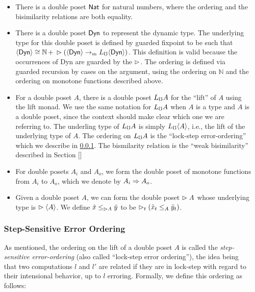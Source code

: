 \begin{itemize}
  \item There is a double poset $\mathsf{Nat}$ for natural numbers, where the ordering and the
  bisimilarity relations are both equality.
  
  \item There is a double poset $\mathsf{Dyn}$ to represent the dynamic type. The underlying type
  for this double poset is defined by guarded fixpoint to be such that
  $\langle {\mathsf{Dyn}} \rangle \cong \mathbb{N}\, +\, \vartriangleright (\langle {\mathsf{Dyn}} \rangle \to_m L_\mho \langle {\mathsf{Dyn}} \rangle)$.
  This definition is valid because the occurrences of Dyn are guarded by the $\vartriangleright$.
  The ordering is defined via guarded recursion by cases on the argument, using the
  ordering on $\mathbb{N}$ and the ordering on monotone functions described above.

  \item For a double poset $A$, there is a double poset $L_\mho A$ for the ``lift'' of $A$
  using the lift monad. We use the same notation for $L_\mho A$ when $A$ is a type
  and $A$ is a double poset, since the context should make clear which one we are referring to.
  The underling type of $L_\mho A$ is simply $L_\mho \langle {A} \rangle$, i.e., the lift of the underlying
  type of $A$.
  The ordering on $L_\mho A$ is the ``lock-step error-ordering'' which we describe in
  \ref{subsec:lock-step}. The bismilarity relation is the ``weak bisimilarity''
  described in Section \ref{}

  \item For double posets $A_i$ and $A_o$, we form the double poset of monotone functions
  from $A_i$ to $A_o$, which we denote by $A_i \Rightarrow A_o$.

  \item Given a double poset $A$, we can form the double poset $\vartriangleright A$ whose underlying
  type is $\vartriangleright \langle {A} \rangle$. We define $\tilde{x} \le_{\vartriangleright A} \tilde{y}$ to be
  $\vartriangleright_t (\tilde{x}_t \le_A \tilde{y}_t)$.
\end{itemize}

\subsubsection{Step-Sensitive Error Ordering}\label{subsec:lock-step}

As mentioned, the ordering on the lift of a double poset $A$ is called the
\emph{step-sensitive error-ordering} (also called ``lock-step error ordering''),
the idea being that two computations $l$ and $l'$ are related if they are in
lock-step with regard to their intensional behavior, up to $l$ erroring.
Formally, we define this ordering as follows:

